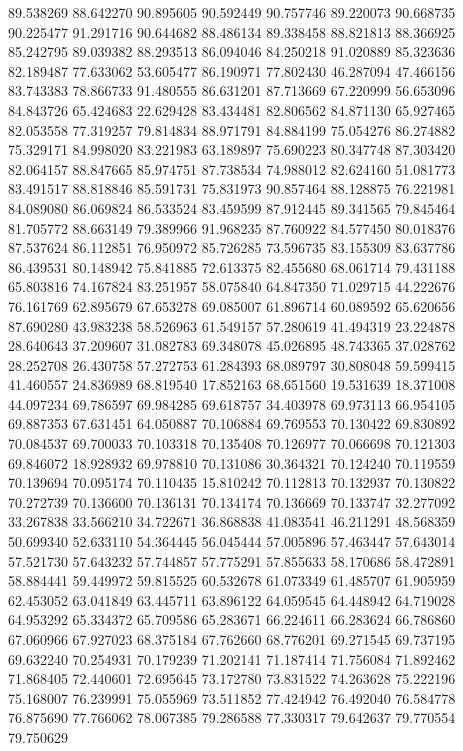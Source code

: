 89.538269
88.642270
90.895605
90.592449
90.757746
89.220073
90.668735
90.225477
91.291716
90.644682
88.486134
89.338458
88.821813
88.366925
85.242795
89.039382
88.293513
86.094046
84.250218
91.020889
85.323636
82.189487
77.633062
53.605477
86.190971
77.802430
46.287094
47.466156
83.743383
78.866733
91.480555
86.631201
87.713669
67.220999
56.653096
84.843726
65.424683
22.629428
83.434481
82.806562
84.871130
65.927465
82.053558
77.319257
79.814834
88.971791
84.884199
75.054276
86.274882
75.329171
84.998020
83.221983
63.189897
75.690223
80.347748
87.303420
82.064157
88.847665
85.974751
87.738534
74.988012
82.624160
51.081773
83.491517
88.818846
85.591731
75.831973
90.857464
88.128875
76.221981
84.089080
86.069824
86.533524
83.459599
87.912445
89.341565
79.845464
81.705772
88.663149
79.389966
91.968235
87.760922
84.577450
80.018376
87.537624
86.112851
76.950972
85.726285
73.596735
83.155309
83.637786
86.439531
80.148942
75.841885
72.613375
82.455680
68.061714
79.431188
65.803816
74.167824
83.251957
58.075840
64.847350
71.029715
44.222676
76.161769
62.895679
67.653278
69.085007
61.896714
60.089592
65.620656
87.690280
43.983238
58.526963
61.549157
57.280619
41.494319
23.224878
28.640643
37.209607
31.082783
69.348078
45.026895
48.743365
37.028762
28.252708
26.430758
57.272753
61.284393
68.089797
30.808048
59.599415
41.460557
24.836989
68.819540
17.852163
68.651560
19.531639
18.371008
44.097234
69.786597
69.984285
69.618757
34.403978
69.973113
66.954105
69.887353
67.631451
64.050887
70.106884
69.769553
70.130422
69.830892
70.084537
69.700033
70.103318
70.135408
70.126977
70.066698
70.121303
69.846072
18.928932
69.978810
70.131086
30.364321
70.124240
70.119559
70.139694
70.095174
70.110435
15.810242
70.112813
70.132937
70.130822
70.272739
70.136600
70.136131
70.134174
70.136669
70.133747
32.277092
33.267838
33.566210
34.722671
36.868838
41.083541
46.211291
48.568359
50.699340
52.633110
54.364445
56.045444
57.005896
57.463447
57.643014
57.521730
57.643232
57.744857
57.775291
57.855633
58.170686
58.472891
58.884441
59.449972
59.815525
60.532678
61.073349
61.485707
61.905959
62.453052
63.041849
63.445711
63.896122
64.059545
64.448942
64.719028
64.953292
65.334372
65.709586
65.283671
66.224611
66.283624
66.786860
67.060966
67.927023
68.375184
67.762660
68.776201
69.271545
69.737195
69.632240
70.254931
70.179239
71.202141
71.187414
71.756084
71.892462
71.868405
72.440601
72.695645
73.172780
73.831522
74.263628
75.222196
75.168007
76.239991
75.055969
73.511852
77.424942
76.492040
76.584778
76.875690
77.766062
78.067385
79.286588
77.330317
79.642637
79.770554
79.750629
